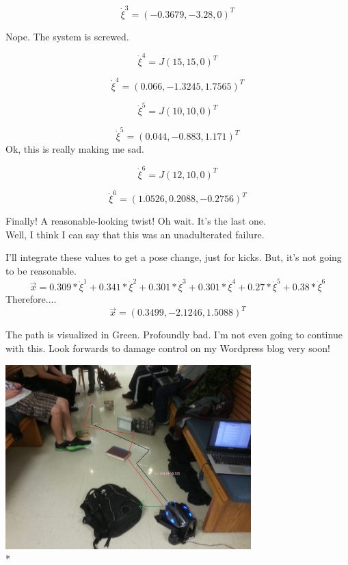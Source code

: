 \documentclass{article}
\begin{document}
$$
\dot{\xi}^3 = (-0.3679, -3.28, 0)^T
$$

Nope. The system is screwed.

$$
\dot{\xi}^4 = J(15, 15, 0)^T
$$

$$
\dot{\xi}^4 = (0.066, -1.3245, 1.7565)^T
$$

$$
\dot{\xi}^5 = J(10, 10, 0)^T
$$

$$
\dot{\xi}^5 = (0.044, -0.883, 1.171)^T
$$
Ok, this is really making me sad.

$$
\dot{\xi}^6 = J(12, 10, 0)^T
$$

$$
\dot{\xi}^6 = (1.0526, 0.2088, -0.2756)^T
$$

Finally! A reasonable-looking twist! Oh wait. It's the last one. \\

Well, I think I can say that this was an unadulterated failure.

I'll integrate these values to get a pose change, just for kicks. But, it's not going to be reasonable.
$$
\vec{x} = 0.309 * \dot{\xi}^1 + 0.341 * \dot{\xi}^2 + 0.301 * \dot{\xi}^3 + 0.301 * \dot{\xi}^4 + 0.27 * \dot{\xi}^5 + 0.38 * \dot{\xi}^6
$$
Therefore....
$$
\vec{x} = (0.3499, -2.1246, 1.5088)^T
$$

The path is visualized in Green. Profoundly bad. I'm not even going to continue with this. Look forwards to damage control on my Wordpress blog very soon!

{
\centering
\includegraphics[width=9.5cm]{odometry.jpg} \\*
}
\end{document}
